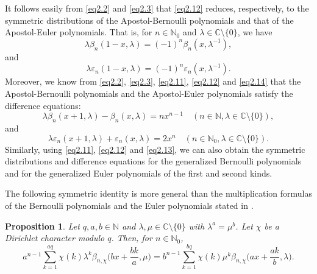 \documentclass[reqno]{amsart}
\numberwithin{equation}{section}
\newtheorem{proposition}[thm]{Proposition}
\begin{document}
It follows easily from \eqref{eq2.2} and \eqref{eq2.3} that \eqref{eq2.12} reduces, respectively, to the symmetric distributions of the Apostol-Bernoulli polynomials and that of the Apostol-Euler polynomials. That is, for $n\in\mathbb{N}_{0}$ and $\lambda\in\mathbb{C}\setminus\{0\}$, we have
\begin{equation}\label{eq2.14}
\lambda\beta_{n}(1-x,\lambda)=(-1)^{n}\beta_{n}(x,\lambda^{-1}),
\end{equation}
and
\begin{equation}\label{eq2.15}
\lambda\varepsilon_{n}(1-x,\lambda)=(-1)^{n}\varepsilon_{n}(x,\lambda^{-1}).
\end{equation}
Moreover, we know from \eqref{eq2.2}, \eqref{eq2.3}, \eqref{eq2.11}, \eqref{eq2.12} and \eqref{eq2.14} that the Apostol-Bernoulli polynomials and the Apostol-Euler polynomials satisfy the difference equations:
\begin{equation}\label{eq2.16}
\lambda\beta_{n}(x+1,\lambda)-\beta_{n}(x,\lambda)=nx^{n-1}\quad(n\in\mathbb{N},\lambda\in\mathbb{C}\setminus\{0\}),
\end{equation}
and
\begin{equation}\label{eq2.17}
\lambda\varepsilon_{n}(x+1,\lambda)+\varepsilon_{n}(x,\lambda)=2x^{n}\quad(n\in\mathbb{N}_{0},\lambda\in\mathbb{C}\setminus\{0\}).
\end{equation}
Similarly, using \eqref{eq2.11}, \eqref{eq2.12} and \eqref{eq2.13}, we can also obtain the symmetric distributions and difference equations for the generalized Bernoulli polynomials and for the generalized Euler polynomials of the first and second kinds.

The following symmetric identity is more general than the multiplication formulas of the Bernoulli polynomials and the Euler polynomials stated in \cite[Chapter 2]{norlund}.

\begin{proposition}\label{pro2.4} Let $q,a,b\in\mathbb{N}$ and $\lambda,\mu\in\mathbb{C}\setminus\{0\}$ with $\lambda^{a}=\mu^{b}$. Let $\chi$ be a Dirichlet character modulo $q$. Then, for $n\in\mathbb{N}_{0}$,
\begin{equation}\label{eq2.18}
a^{n-1}\sum_{k=1}^{aq}\chi(k)\lambda^{k}\beta_{n,\chi}\biggl(bx+\frac{bk}{a},\mu\biggl)=b^{n-1}\sum_{k=1}^{bq}\chi(k)\mu^{k}\beta_{n,\chi}\biggl(ax+\frac{ak}{b},\lambda\biggl).
\end{equation}
\end{proposition}
\end{document}
